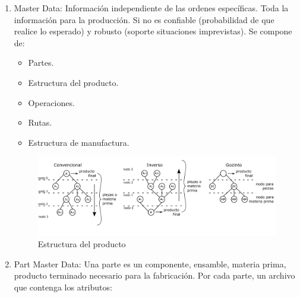 \begin{enumerate}
    \item Master Data: Información independiente de las ordenes específicas. Toda la información para la producción. Si no es confiable (probabilidad de que realice lo esperado) y robusto (soporte situaciones imprevistas). Se compone de:
    
    \begin{itemize}
        \item Partes.
        \item Estructura del producto.
        \item Operaciones.
        \item Rutas.
        \item Estructura de manufactura.
    \end{itemize}
    
    \begin{figure}[h!]
    \centering
        \includegraphics[scale=0.20]{Manufactura Integrada por Computadora Figuras/Figura04 Estructura del Producto.png}
        \caption{Estructura del producto}
    \end{figure}
    
    \item Part Master Data: Una parte es un componente, ensamble, materia prima, producto terminado necesario para la fabricación. Por cada parte, un archivo que contenga los atributos:
    

\end{enumerate}
